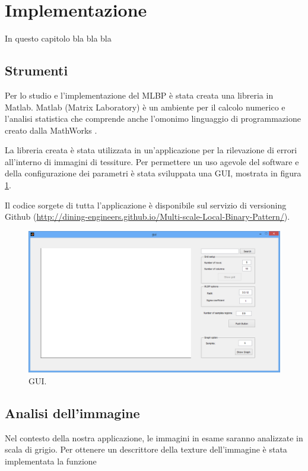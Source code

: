 \section{Implementazione}
In questo capitolo bla bla bla

\subsection{Strumenti}
Per lo studio e l'implementazione del \acf{MLBP} è stata creata una libreria in Matlab. 
Matlab (Matrix Laboratory) è un ambiente per il calcolo numerico e l'analisi statistica che comprende anche l'omonimo linguaggio di programmazione creato dalla MathWorks \cite{MATLAB:2013}.

La libreria creata è stata utilizzata in un'applicazione per la rilevazione di errori all'interno di immagini di tessiture.
Per permettere un uso agevole del software e della configurazione dei parametri è stata sviluppata una \acf{GUI}, mostrata in figura \ref{fig:GUI}.

Il codice sorgete di tutta l'applicazione è disponibile sul servizio di versioning Github (\href{http://dining-engineers.github.io/Multi-scale-Local-Binary-Pattern/}{http://dining-engineers.github.io/Multi-scale-Local-Binary-Pattern/}).\\

\begin{figure}[ht]
\begin{center}
\includegraphics[width=.95\textwidth]{img/gui}
\caption{GUI.}
\label{fig:GUI}
\end{center}
\end{figure}

\subsection{Analisi dell'immagine}
\label{imp:analisi}
Nel contesto della nostra applicazione, le immagini in esame saranno analizzate in scala di grigio.
Per ottenere un descrittore della texture dell'immagine è stata implementata la funzione

